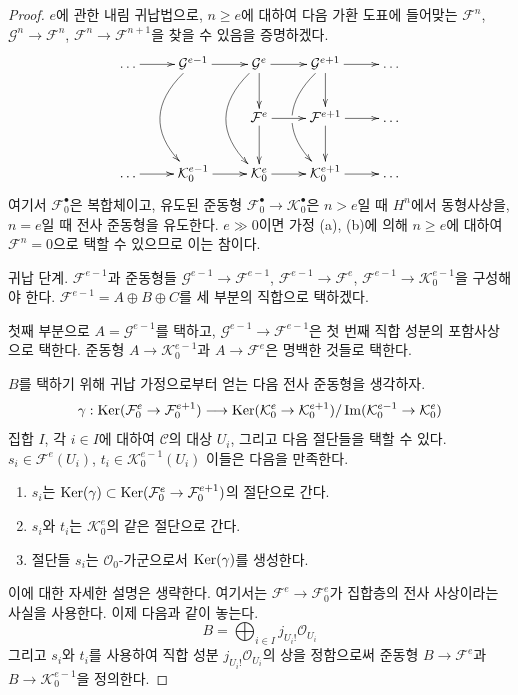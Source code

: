 \begin{proof}
$e$에 관한 내림 귀납법으로, $n \geq e$에 대하여 다음 가환 도표에
들어맞는 $\mathcal{F}^n$, $\mathcal{G}^n \to \mathcal{F}^n$,
$\mathcal{F}^n \to \mathcal{F}^{n + 1}$을 찾을 수 있음을 증명하겠다.
$$
\xymatrix{
\ldots \ar[r] &
\mathcal{G}^{e - 1} \ar[r] \ar@/_2pc/[dd] &
\mathcal{G}^e \ar[d] \ar[r] \ar@/_2pc/[dd] &
\mathcal{G}^{e + 1} \ar[d] \ar[r] \ar@/_2pc/[dd]|\hole &
\ldots \\
& &
\mathcal{F}^e \ar[d] \ar[r] &
\mathcal{F}^{e + 1} \ar[d] \ar[r] & \ldots \\
\ldots  \ar[r] &
\mathcal{K}_0^{e - 1} \ar[r] &
\mathcal{K}_0^e \ar[r] &
\mathcal{K}_0^{e + 1} \ar[r] & \ldots
}
$$
여기서 $\mathcal{F}_0^\bullet$은 복합체이고, 유도된 준동형
$\mathcal{F}_0^\bullet \to \mathcal{K}_0^\bullet$은 $n > e$일 때
$H^n$에서 동형사상을, $n = e$일 때 전사 준동형을 유도한다.
$e \gg 0$이면 가정 (a), (b)에 의해 $n \geq e$에 대하여
$\mathcal{F}^n = 0$으로 택할 수 있으므로 이는 참이다.

\medskip\noindent
귀납 단계. $\mathcal{F}^{e - 1}$과 준동형들
$\mathcal{G}^{e - 1} \to \mathcal{F}^{e - 1}$,
$\mathcal{F}^{e - 1} \to \mathcal{F}^e$,
$\mathcal{F}^{e - 1} \to \mathcal{K}_0^{e - 1}$을 구성해야 한다.
$\mathcal{F}^{e - 1} = A \oplus B \oplus C$를 세 부분의 직합으로
택하겠다.

\medskip\noindent
첫째 부분으로 $A = \mathcal{G}^{e - 1}$를 택하고,
$\mathcal{G}^{e - 1} \to \mathcal{F}^{e - 1}$은 첫 번째 직합 성분의
포함사상으로 택한다. 준동형 $A \to \mathcal{K}^{e - 1}_0$과
$A \to \mathcal{F}^e$은 명백한 것들로 택한다.

\medskip\noindent
$B$를 택하기 위해 귀납 가정으로부터 얻는 다음 전사 준동형을 생각하자.
$$
\gamma :
\mathop{\mathrm{Ker}}(\mathcal{F}^e_0 \to \mathcal{F}^{e + 1}_0)
\longrightarrow
\mathop{\mathrm{Ker}}(\mathcal{K}^e_0 \to \mathcal{K}^{e + 1}_0)/
\mathop{\mathrm{Im}}(\mathcal{K}^{e - 1}_0 \to \mathcal{K}^e_0)
$$
집합 $I$, 각 $i \in I$에 대하여 $\mathcal{C}$의 대상 $U_i$, 그리고
다음 절단들을 택할 수 있다.
$s_i \in \mathcal{F}^e(U_i)$, $t_i \in \mathcal{K}^{e - 1}_0(U_i)$
이들은 다음을 만족한다.
\begin{enumerate}
\item $s_i$는 $\mathop{\mathrm{Ker}}(\gamma) \subset
\mathop{\mathrm{Ker}}(\mathcal{F}^e_0 \to \mathcal{F}^{e + 1}_0)$의 절단으로 간다.
\item $s_i$와 $t_i$는 $\mathcal{K}^e_0$의 같은 절단으로 간다.
\item 절단들 $s_i$는 $\mathcal{O}_0$-가군으로서 $\mathop{\mathrm{Ker}}(\gamma)$를
생성한다.
\end{enumerate}
이에 대한 자세한 설명은 생략한다. 여기서는
$\mathcal{F}^e \to \mathcal{F}^e_0$가 집합층의 전사 사상이라는 사실을
사용한다. 이제 다음과 같이 놓는다.
$$
B = \bigoplus\nolimits_{i \in I} j_{U_i!}\mathcal{O}_{U_i}
$$
그리고 $s_i$와 $t_i$를 사용하여 직합 성분
$j_{U_i!}\mathcal{O}_{U_i}$의 상을 정함으로써 준동형
$B \to \mathcal{F}^e$과 $B \to \mathcal{K}_0^{e - 1}$을 정의한다.


\end{proof}
